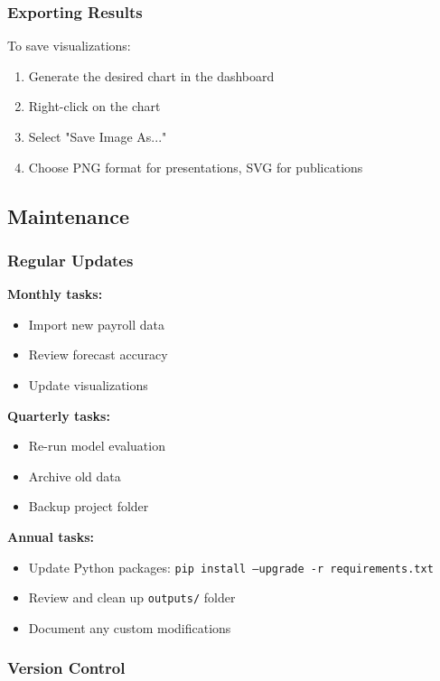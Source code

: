 \documentclass[11pt,a4paper]{article}
\begin{document}
\subsubsection{Exporting Results}

To save visualizations:
\begin{enumerate}[leftmargin=*]
    \item Generate the desired chart in the dashboard
    \item Right-click on the chart
    \item Select "Save Image As..."
    \item Choose PNG format for presentations, SVG for publications
\end{enumerate}

\subsection{Maintenance}

\subsubsection{Regular Updates}

\textbf{Monthly tasks:}
\begin{itemize}[leftmargin=*]
    \item Import new payroll data
    \item Review forecast accuracy
    \item Update visualizations
\end{itemize}

\textbf{Quarterly tasks:}
\begin{itemize}[leftmargin=*]
    \item Re-run model evaluation
    \item Archive old data
    \item Backup project folder
\end{itemize}

\textbf{Annual tasks:}
\begin{itemize}[leftmargin=*]
    \item Update Python packages: \texttt{pip install --upgrade -r requirements.txt}
    \item Review and clean up \texttt{outputs/} folder
    \item Document any custom modifications
\end{itemize}

\subsubsection{Version Control}
\end{document}
